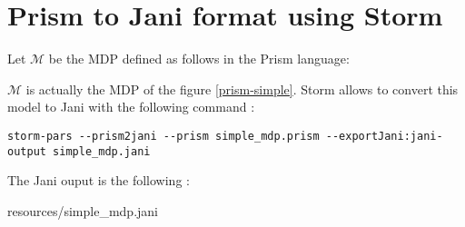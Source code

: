 \addtocounter{chapter}{1}
\setcounter{section}{0}
\section{Prism to Jani format using Storm}\label{prism2jani}
Let $\mathcal{M}$ be the MDP defined as follows in the Prism language:

$\mathcal{M}$ is actually the MDP of the figure \ref{prism-simple}.
Storm allows to convert this model to Jani with the following command :
{\scriptsize
\begin{verbatim}
storm-pars --prism2jani --prism simple_mdp.prism --exportJani:jani-output simple_mdp.jani
\end{verbatim}
}
The Jani ouput is the following :

    {resources/simple_mdp.jani}


